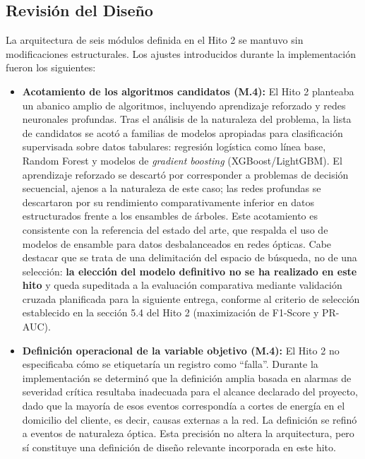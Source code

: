 \documentclass[12pt,a4paper]{article}
\begin{document}
\subsection{Revisión del Diseño}
 \noindent
La arquitectura de seis módulos definida en el Hito 2 se mantuvo sin modificaciones estructurales. Los ajustes introducidos durante la implementación fueron los siguientes:
\begin{itemize}
 
\item \textbf{Acotamiento de los algoritmos candidatos (M.4):} El Hito 2 planteaba un abanico amplio de algoritmos, incluyendo aprendizaje reforzado y redes neuronales profundas. Tras el análisis de la naturaleza del problema, la lista de candidatos se acotó a familias de modelos apropiadas para clasificación supervisada sobre datos tabulares: regresión logística como línea base, Random Forest y modelos de \textit{gradient boosting} (XGBoost/LightGBM). El aprendizaje reforzado se descartó por corresponder a problemas de decisión secuencial, ajenos a la naturaleza de este caso; las redes profundas se descartaron por su rendimiento comparativamente inferior en datos estructurados frente a los ensambles de árboles. Este acotamiento es consistente con la referencia \cite{stacking_ensemble} del estado del arte, que respalda el uso de modelos de ensamble para datos desbalanceados en redes ópticas. Cabe destacar que se trata de una delimitación del espacio de búsqueda, no de una selección: \textbf{la elección del modelo definitivo no se ha realizado en este hito} y queda supeditada a la evaluación comparativa mediante validación cruzada planificada para la siguiente entrega, conforme al criterio de selección establecido en la sección 5.4 del Hito 2 (maximización de F1-Score y PR-AUC).
 
\item \textbf{Definición operacional de la variable objetivo (M.4):} El Hito 2 no especificaba cómo se etiquetaría un registro como ``falla''. Durante la implementación se determinó que la definición amplia basada en alarmas de severidad crítica resultaba inadecuada para el alcance declarado del proyecto, dado que la mayoría de esos eventos correspondía a cortes de energía en el domicilio del cliente, es decir, causas externas a la red. La definición se refinó a eventos de naturaleza óptica. Esta precisión no altera la arquitectura, pero sí constituye una definición de diseño relevante incorporada en este hito.
 

\end{itemize}
\end{document}
